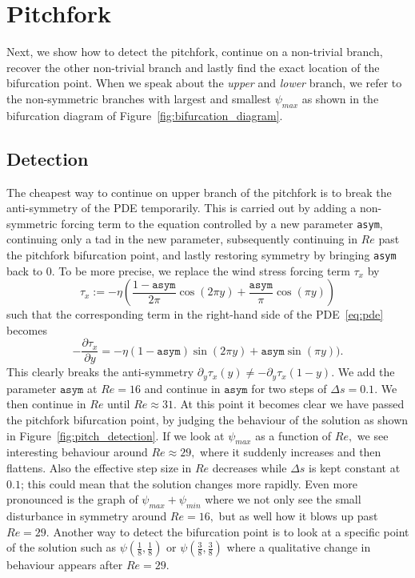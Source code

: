 \section{Pitchfork}

Next, we show how to detect the pitchfork, continue on a non-trivial branch, recover the other non-trivial branch and lastly find the exact location of the bifurcation point. When we speak about the {\em upper} and {\em lower} branch, we refer to the non-symmetric branches with largest and smallest $\psi_{max}$ as shown in the bifurcation diagram of Figure~\ref{fig:bifurcation_diagram}.

\subsection{Detection}
The cheapest way to continue on upper branch of the pitchfork is to break the anti-symmetry of the PDE temporarily. This is carried out by adding a non-symmetric forcing term to the equation controlled by a new parameter {\tt asym}, continuing only a tad in the new parameter, subsequently continuing in $Re$ past the pitchfork bifurcation point, and lastly restoring symmetry by bringing {\tt asym} back to 0. To be more precise, we replace the wind stress forcing term $\tau_x$ by
\begin{equation}
    \tau_x := -\eta \left( \frac{1 - \mathtt{asym}}{2 \pi} \cos(2\pi y) + \frac{\mathtt{asym}}{\pi} \cos(\pi y) \right)
\end{equation}
such that the corresponding term in the right-hand side of the PDE~\eqref{eq:pde} becomes
\begin{equation}
    -\frac{\partial \tau_x}{\partial y} = -\eta (1 - \mathtt{asym})\sin(2\pi y) + \mathtt{asym}\sin(\pi y)).
\end{equation}
This clearly breaks the anti-symmetry $\partial_y \tau_x(y) \neq -\partial_y \tau_x(1 - y).$ We add the parameter $\mathtt{asym}$ at $Re = 16$ and continue in $\mathtt{asym}$ for two steps of $\Delta s = 0.1.$ We then continue in $Re$ until $Re \approx 31.$ At this point it becomes clear we have passed the pitchfork bifurcation point, by judging the behaviour of the solution as shown in Figure~\ref{fig:pitch_detection}. If we look at $\psi_{max}$ as a function of $Re,$ we see interesting behaviour around $Re \approx 29,$ where it suddenly increases and then flattens. Also the effective step size in $Re$ decreases while $\Delta s$ is kept constant at $0.1$; this could mean that the solution changes more rapidly. Even more pronounced is the graph of $\psi_{max} + \psi_{min}$ where we not only see the small disturbance in symmetry around $Re = 16,$ but as well how it blows up past $Re = 29.$ Another way to detect the bifurcation point is to look at a specific point of the solution such as $\psi(\tfrac{1}{8}, \tfrac{1}{8})$ or $\psi(\tfrac{3}{8}, \tfrac{3}{8})$ where a qualitative change in behaviour appears after $Re = 29.$

